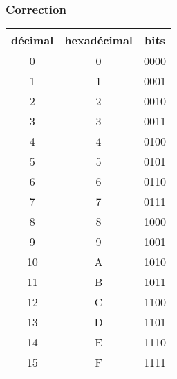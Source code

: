 \documentclass[svgnames,11pt]{beamer}
\begin{document}
\begin{frame}
    \frametitle{Correction}

    \begin{center}{\small
        \begin{tabular}{|c|c|c|}
        \hline 
        décimal&hexadécimal & bits \\ 
        \hline 
        0&0 & 0000 \\ 
        \hline 
        1&1 & 0001 \\ 
        \hline 
        2&2 & 0010 \\ 
        \hline 
        3&3 & 0011 \\ 
        \hline 
        4&4 & 0100 \\ 
        \hline 
        5&5 & 0101 \\ 
        \hline 
        6&6 & 0110 \\ 
        \hline 
        7&7 &  0111\\ 
        \hline 
        8&8 &  1000\\ 
        \hline 
        9&9 &  1001\\ 
        \hline 
        10&A & 1010 \\ 
        \hline 
        11&B & 1011 \\ 
        \hline 
        12&C &  1100\\ 
        \hline 
        13&D &  1101\\ 
        \hline 
        14&E &  1110\\ 
        \hline 
        15&F &  1111\\ 
        \hline 
        \end{tabular} }
        \end{center}

\end{frame}
\end{document}
